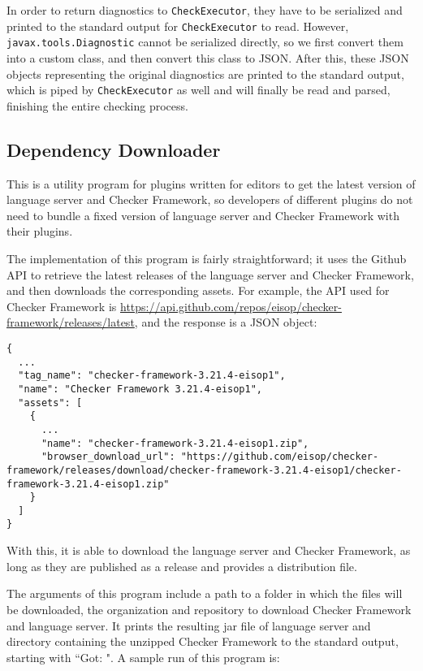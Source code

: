 \documentclass{article}
\begin{document}
In order to return diagnostics to \verb|CheckExecutor|, they have to be
serialized and printed to the standard output for \verb|CheckExecutor| to read.
However, \verb|javax.tools.Diagnostic| cannot be serialized directly, so we
first convert them into a custom class, and then convert this class to JSON.
After this, these JSON objects representing the original diagnostics are printed
to the standard output, which is piped by \verb|CheckExecutor| as well and will
finally be read and parsed, finishing the entire checking process.

\subsection{Dependency Downloader}

This is a utility program for plugins written for editors to get the latest
version of language server and Checker Framework, so developers of different
plugins do not need to bundle a fixed version of language server and Checker
Framework with their plugins.

The implementation of this program is fairly straightforward; it uses the Github
API to retrieve the latest releases of the language server and Checker
Framework, and then downloads the corresponding assets. For example, the API
used for Checker Framework is
\url{https://api.github.com/repos/eisop/checker-framework/releases/latest},
and the response is a JSON object:

\begin{lstlisting}
{
  ...
  "tag_name": "checker-framework-3.21.4-eisop1",
  "name": "Checker Framework 3.21.4-eisop1",
  "assets": [
    {
      ...
      "name": "checker-framework-3.21.4-eisop1.zip",
      "browser_download_url": "https://github.com/eisop/checker-framework/releases/download/checker-framework-3.21.4-eisop1/checker-framework-3.21.4-eisop1.zip"
    }
  ]
}
\end{lstlisting}

With this, it is able to download the language server and Checker Framework, as
long as they are published as a release and provides a distribution file.

The arguments of this program include a path to a folder in which the files will
be downloaded, the organization and repository to download Checker Framework and
language server. It prints the resulting jar file of language server and
directory containing the unzipped Checker Framework to the standard output,
starting with ``Got: ". A sample run of this program is:
\end{document}
